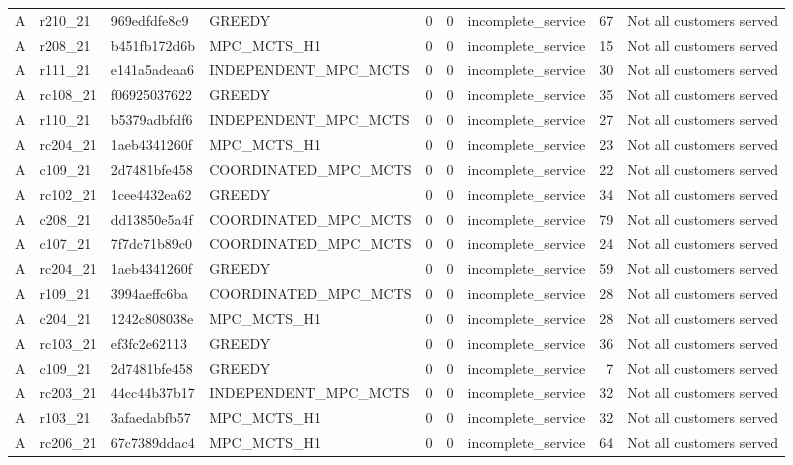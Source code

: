 \begin{table}
{\begin{tabular}{llllrrlrl}
A & r210\_21 & 969edfdfe8c9 & GREEDY & 0 & 0 & incomplete\_service & 67 & Not all customers served \\
A & r208\_21 & b451fb172d6b & MPC\_MCTS\_H1 & 0 & 0 & incomplete\_service & 15 & Not all customers served \\
A & r111\_21 & e141a5adeaa6 & INDEPENDENT\_MPC\_MCTS & 0 & 0 & incomplete\_service & 30 & Not all customers served \\
A & rc108\_21 & f06925037622 & GREEDY & 0 & 0 & incomplete\_service & 35 & Not all customers served \\
A & r110\_21 & b5379adbfdf6 & INDEPENDENT\_MPC\_MCTS & 0 & 0 & incomplete\_service & 27 & Not all customers served \\
A & rc204\_21 & 1aeb4341260f & MPC\_MCTS\_H1 & 0 & 0 & incomplete\_service & 23 & Not all customers served \\
A & c109\_21 & 2d7481bfe458 & COORDINATED\_MPC\_MCTS & 0 & 0 & incomplete\_service & 22 & Not all customers served \\
A & rc102\_21 & 1cee4432ea62 & GREEDY & 0 & 0 & incomplete\_service & 34 & Not all customers served \\
A & c208\_21 & dd13850e5a4f & COORDINATED\_MPC\_MCTS & 0 & 0 & incomplete\_service & 79 & Not all customers served \\
A & c107\_21 & 7f7dc71b89c0 & COORDINATED\_MPC\_MCTS & 0 & 0 & incomplete\_service & 24 & Not all customers served \\
A & rc204\_21 & 1aeb4341260f & GREEDY & 0 & 0 & incomplete\_service & 59 & Not all customers served \\
A & r109\_21 & 3994aeffc6ba & COORDINATED\_MPC\_MCTS & 0 & 0 & incomplete\_service & 28 & Not all customers served \\
A & c204\_21 & 1242c808038e & MPC\_MCTS\_H1 & 0 & 0 & incomplete\_service & 28 & Not all customers served \\
A & rc103\_21 & ef3fc2e62113 & GREEDY & 0 & 0 & incomplete\_service & 36 & Not all customers served \\
A & c109\_21 & 2d7481bfe458 & GREEDY & 0 & 0 & incomplete\_service & 7 & Not all customers served \\
A & rc203\_21 & 44cc44b37b17 & INDEPENDENT\_MPC\_MCTS & 0 & 0 & incomplete\_service & 32 & Not all customers served \\
A & r103\_21 & 3afaedabfb57 & MPC\_MCTS\_H1 & 0 & 0 & incomplete\_service & 32 & Not all customers served \\
A & rc206\_21 & 67c7389ddac4 & MPC\_MCTS\_H1 & 0 & 0 & incomplete\_service & 64 & Not all customers served \\

\end{tabular}}
\end{table}
